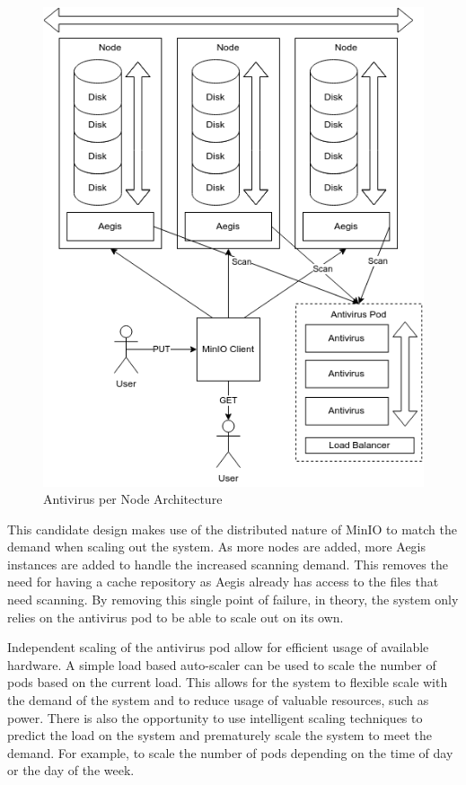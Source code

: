 \documentclass[12pt, conference, final, a4paper, onecolumn, compsoc]{IEEEtran}
\begin{document}
\begin{figure}
  \centering \includegraphics[scale=.3]{diagrams/per-node.png}
  \caption{Antivirus per Node Architecture}
  \label{fig:perNodeArch}
\end{figure}

This candidate design makes use of the distributed nature of MinIO to match the
demand when scaling out the system. As more nodes are added, more Aegis
instances are added to handle the increased scanning demand. This removes the
need for having a cache repository as Aegis already has access to the files that
need scanning. By removing this single point of failure, in theory, the system
only relies on the antivirus pod to be able to scale out on its own.

Independent scaling of the antivirus pod allow for efficient usage of available
hardware. A simple load based auto-scaler can be used to scale the number of
pods based on the current load. This allows for the system to flexible scale
with the demand of the system and to reduce usage of valuable resources, such as
power. There is also the opportunity to use intelligent scaling techniques to
predict the load on the system and prematurely scale the system to meet the
demand. For example, to scale the number of pods depending on the time of day or
the day of the week.
\end{document}
